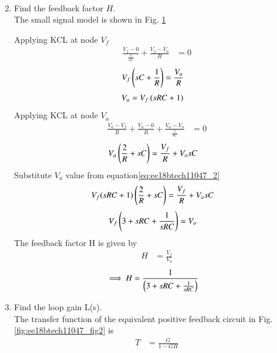 \begin{enumerate}[label=\thesection.\arabic*.,ref=\thesection.\theenumi]
\begin{align}
\end{align}
%
\item Find the feedback factor $H$. \\
\label{prob:ee18btech11047_H}
\solution The small signal model is shown in Fig. \ref{fig:ee18btech11047_fig3}
\begin{figure}[!ht]
	\begin{center}
		\resizebox{\columnwidth}{!}{}
	\end{center}
\caption{}
\label{fig:ee18btech11047_fig3}
\end{figure}
Applying KCL at node $V_f$
\begin{align}
\frac{V_{f} - 0}{\frac{1}{sC}} +\frac{V_{f} - V_{a}}{R} &= 0
\end{align}
\begin{align}
V_{f}\left(sC+\frac{1}{R}\right) &= \frac{V_{a}}{R} 
\end{align}
\begin{align}
\label{eq:ee18btech11047_2}
V_{a} &= V_{f}\brak{sRC + 1} 
\end{align}
Applying KCL at node $V_{a}$
\begin{align}
\frac{V_{a} - V_{f}}{R} + \frac{V_{a} - 0}{R} + \frac{V_{a} - V_{o}}{\frac{1}{sC}} &= 0
\end{align}
\begin{align}
V_{a}\left(\frac{2}{R} +sC\right) &= \frac{V_{f}}{R} + V_{o}sC
\end{align}
Substitute $V_{a}$ value from equation\eqref{eq:ee18btech11047_2}
\begin{align}
V_{f}(sRC + 1)\left(\frac{2}{R} + sC\right) &= \frac{V_{f}}{R} + V_{o}sC
\end{align}
\begin{align}
V_{f}\left(3 + sRC + \frac{1}{sRC}\right) &= V_{o}
\end{align}
The feedback factor H is given by 
\begin{align}
H &= \frac{V_{f}}{V_{o}}
\end{align}
\begin{align}
\label{eq:ee18btech11047_3}
\implies H &= \frac{1}{\brak{3+sRC +\frac{1}{sRC}}}
\end{align}
%
\item Find the loop gain L(s).\\
\solution The transfer function of the equivalent positive feedback circuit in Fig. \ref{fig:ee18btech11047_fig2} is  
\begin{align}
T &= \frac{G}{1-GH}
\label{eq:ee18btech11047_TF}

\end{align}
\end{enumerate}
